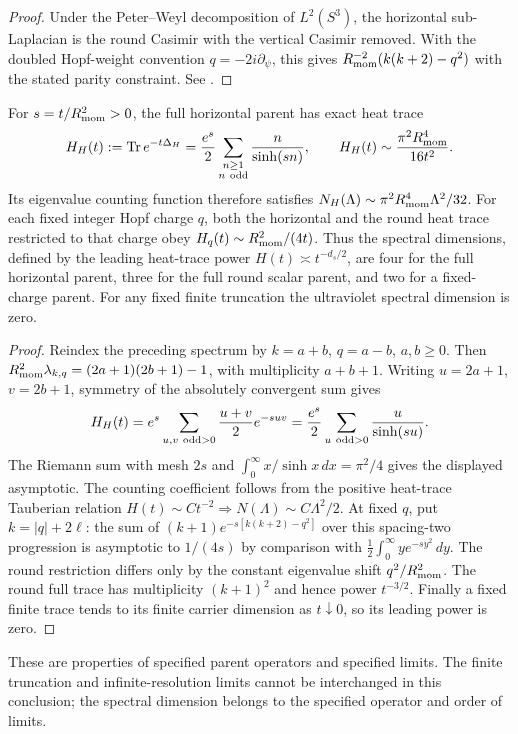 \documentclass[11pt]{article}
\begin{document}
\begin{proof}
Under the Peter--Weyl decomposition of \(L^2(S^3)\), the horizontal sub-Laplacian is the round Casimir with the vertical Casimir removed. With the doubled Hopf-weight convention \(q=-2i\partial_\psi\), this gives \(R_{\mathrm{mom}}^{-2}(k(k+2)-q^2)\) with the stated parity constraint. See \cite{cowlingSikora2001su2}.
\end{proof}


\begin{theorem}
\label{p1:thm:horizontal-spectral-dimensions}
For $s=t/R_{\mathrm{mom}}^2>0$, the full horizontal parent has exact heat trace
\[
 H_H(t):=\operatorname{Tr}e^{-t\Delta_H}
 =\frac{e^s}{2}\sum_{\substack{n\ge1\\n\ {\rm odd}}}
       \frac{n}{\sinh(sn)},
 \qquad
 H_H(t)\sim\frac{\pi^2R_{\mathrm{mom}}^4}{16t^2}.
\]
Its eigenvalue counting function therefore satisfies
$N_H(\Lambda)\sim\pi^2R_{\mathrm{mom}}^4\Lambda^2/32$.
For each fixed integer Hopf charge $q$, both the horizontal and the round
heat trace restricted to that charge obey
$H_q(t)\sim R_{\mathrm{mom}}^2/(4t)$.
Thus the spectral dimensions, defined by the leading heat-trace power
$H(t)\asymp t^{-d_s/2}$, are four for the full horizontal parent, three
for the full round scalar parent, and two for a fixed-charge parent.
For any fixed finite truncation the ultraviolet spectral dimension is zero.
\end{theorem}
\begin{proof}
Reindex the preceding spectrum by $k=a+b$, $q=a-b$, $a,b\ge0$.
Then $R_{\mathrm{mom}}^2\lambda_{k,q}=(2a+1)(2b+1)-1$, with multiplicity $a+b+1$.
Writing $u=2a+1$, $v=2b+1$, symmetry of the absolutely convergent sum gives
\[
 H_H(t)=e^s\sum_{u,v\ {\rm odd}>0}\frac{u+v}{2}e^{-suv}
 =\frac{e^s}{2}\sum_{u\ {\rm odd}>0}\frac{u}{\sinh(su)}.
\]
The Riemann sum with mesh $2s$ and
$\int_0^\infty x/\sinh x\,dx=\pi^2/4$ gives the displayed asymptotic.
The counting coefficient follows from the positive heat-trace Tauberian
relation $H(t)\sim C t^{-2}\Rightarrow N(\Lambda)\sim C\Lambda^2/2$.
At fixed $q$, put $k=|q|+2\ell$: the sum of
$(k+1)e^{-s[k(k+2)-q^2]}$ over this spacing-two progression is asymptotic
to $1/(4s)$ by comparison with
$\tfrac12\int_0^\infty y e^{-sy^2}\,dy$.  The round restriction differs
only by the constant eigenvalue shift $q^2/R_{\mathrm{mom}}^2$.
The round full trace has multiplicity $(k+1)^2$ and hence power $t^{-3/2}$.
Finally a fixed finite trace tends to its finite carrier dimension as
$t\downarrow0$, so its leading power is zero.
\end{proof}
These are properties of specified parent operators and specified limits.
The finite truncation and infinite-resolution limits cannot be interchanged
in this conclusion; the spectral dimension belongs to the specified operator
and order of limits.
\end{document}
